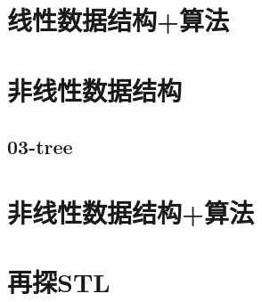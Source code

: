 \documentclass{beamer}
\begin{document}
\section{线性数据结构+算法}






\section{非线性数据结构}
\subsection{03-tree}
% 
% 
% 
% 






\section{非线性数据结构+算法}








\section{再探STL}
\end{document}
